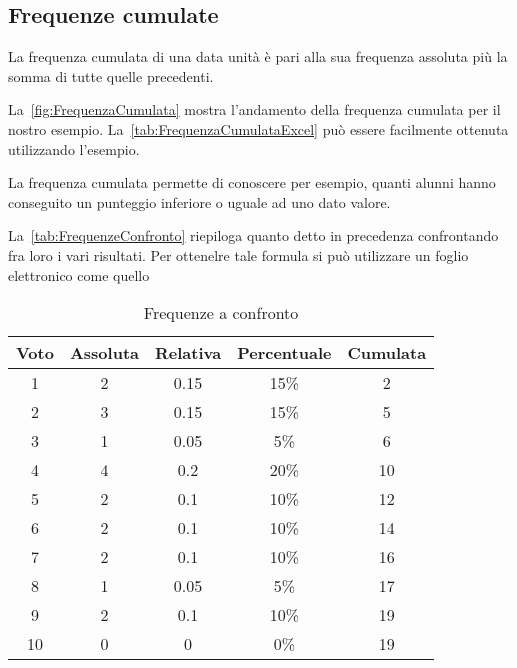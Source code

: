 \subsection{Frequenze cumulate}
\begin{defn}
	La frequenza cumulata di una data unità è pari alla sua frequenza assoluta più la somma di tutte quelle precedenti.
\end{defn}
La~\vref*{fig:FrequenzaCumulata} mostra l'andamento della frequenza cumulata per il nostro esempio. La~\vref{tab:FrequenzaCumulataExcel} può essere facilmente ottenuta utilizzando l'esempio.

La frequenza cumulata permette di conoscere per esempio, quanti alunni hanno conseguito un punteggio inferiore o uguale ad uno dato valore.

La~\vref{tab:FrequenzeConfronto} riepiloga quanto detto in precedenza confrontando fra loro i vari risultati. Per ottenelre tale formula si può utilizzare un foglio elettronico come quello~
\begin{table}[!t]
	\centering
 	 \begin{tabular} {*{2} {S[table-format=1.0]}S[table-format=1.2]*{2} {S[table-format=2.0]} }%
 	 	\toprule
 	 	{Voto}  & {Assoluta} & {Relativa} & {Percentuale} &{Cumulata} \\
 	 		& 2 & 0.15 & 15\% & 2  \\ 
 	 	2	& 3 & 0.15 & 15\% & 5 \\ 
 	 	3	& 1 & 0.05 & 5\% & 6 \\ 
 	 	4	& 4 & 0.2 & 20\% & 10 \\ 
 	 	5	& 2 & 0.1 & 10\% & 12 \\ 
 	 	6 	& 2 & 0.1 & 10\% & 14 \\ 
 	 	7	& 2 & 0.1 & 10\% & 16 \\ 
 	 	8	& 1 & 0.05 & 5\% & 17 \\ 
 	 	9	& 2 & 0.1 & 10\% & 19 \\ 
 	 	10	& 0 & 0 & 0\% & 19 \\ 
 	 	\bottomrule
 	 \end{tabular}
 	\caption{Frequenze a confronto}
 	\label{tab:FrequenzeConfronto}
 \end{table}
 
 